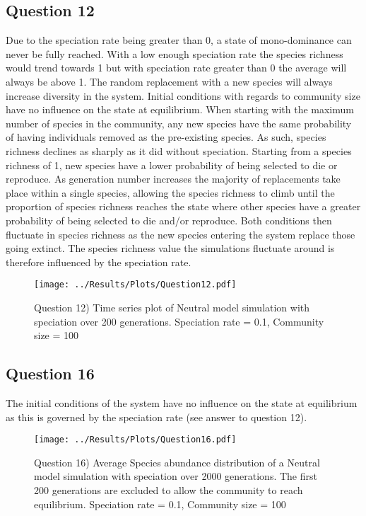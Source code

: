 \documentclass[12pt]{article}
\begin{document}
	\subsection{Question 12}
	Due to the speciation rate being greater than 0, a state of mono-dominance can never be fully reached. With a low enough speciation rate the species richness would trend towards 1 but with speciation rate greater than 0 the average will always be above 1. The random replacement with a new species will always increase diversity in the system. Initial conditions with regards to community size have no influence on the state at equilibrium. When starting with the maximum number of species in the community, any new species have the same probability of having individuals removed as the pre-existing species. As such, species richness declines as sharply as it did without speciation. Starting from a species richness of 1, new species have a lower probability of being selected to die or reproduce. As generation number increases the majority of replacements take place within a single species, allowing the species richness to climb until the proportion of species richness reaches the state where other species have a greater probability of being selected to die and/or reproduce. Both conditions then fluctuate in species richness as the new species entering the system replace those going extinct. The species richness value the simulations fluctuate around is therefore influenced by the speciation rate.

	\begin{figure}[H]
		\centering
		\texttt{[image: ../Results/Plots/Question12.pdf]}
		\caption{Question 12) Time series plot of Neutral model simulation with speciation over 200 generations. Speciation rate = 0.1, Community size = 100}
	\end{figure}

	\subsection{Question 16}
	The initial conditions of the system have no influence on the state at equilibrium as this is governed by the speciation rate (see answer to question 12).
	\begin{figure}[H]
		\centering
		\texttt{[image: ../Results/Plots/Question16.pdf]}
		\caption{Question 16) Average Species abundance distribution of a Neutral model simulation with speciation over 2000 generations. The first 200 generations are excluded to allow the community to reach equilibrium. Speciation rate = 0.1, Community size = 100}
	\end{figure}
    
\end{document}
